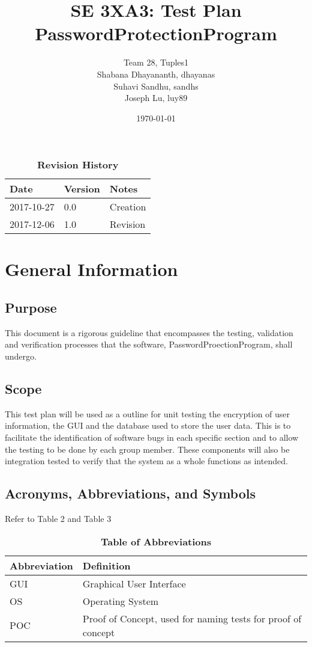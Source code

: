 \documentclass[12pt, titlepage]{article}
\title{SE 3XA3: Test Plan\\PasswordProtectionProgram}
\author{Team 28, Tuples1
		\\ Shabana Dhayananth, dhayanas
		\\ Suhavi Sandhu, sandhs
		\\ Joseph Lu, luy89
}
\date{\today}
\begin{document}
\maketitle

\tableofcontents
\listoftables
\listoffigures

\begin{table}[bp]
\caption{\bf Revision History}
\begin{tabularx}{\textwidth}{p{3cm}p{2cm}X}
\toprule {\bf Date} & {\bf Version} & {\bf Notes}\\
\midrule
2017-10-27 & 0.0 & Creation\\
2017-12-06 & 1.0 & Revision\\
\bottomrule
\end{tabularx}
\end{table}

\newpage


\section{General Information}

\subsection{Purpose}
This document is a rigorous guideline that encompasses the testing, validation and verification processes that the software, PasswordProectionProgram, shall undergo.

\subsection{Scope}
This test plan will be used as a outline for unit testing the encryption of user information, the GUI and the database used to store the user data. This is to facilitate the identification of software bugs in each specific section and to allow the testing to be done by each group member. These components will also be integration tested to verify that the system as a whole functions as intended.


\subsection{Acronyms, Abbreviations, and Symbols}
Refer to Table 2 and Table 3
	
\begin{table}[hbp]
\caption{\textbf{Table of Abbreviations}} \label{0Table}

    \begin{tabularx}{\textwidth}{p{3cm}X}
        \toprule
        \textbf{Abbreviation} & \textbf{Definition} \\
        \midrule
        GUI & Graphical User Interface\\\hline
        OS & Operating System\\\hline
        POC & Proof of Concept, used for naming tests for proof of concept\\
        \bottomrule
    \end{tabularx}

\end{table}
\end{document}
